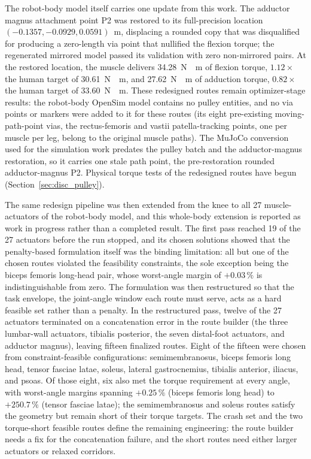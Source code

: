 The robot-body model itself carries one update from this work. The adductor magnus attachment point P2 was restored to its full-precision location $(-0.1357, -0.0929, 0.0591)$~m, displacing a rounded copy that was disqualified for producing a zero-length via point that nullified the flexion torque; the regenerated mirrored model passed its validation with zero non-mirrored pairs. At the restored location, the muscle delivers \qty{34.28}{\newton\cdot\meter} of flexion torque, $1.12\times$ the human target of \qty{30.61}{\newton\cdot\meter}, and \qty{27.62}{\newton\cdot\meter} of adduction torque, $0.82\times$ the human target of \qty{33.60}{\newton\cdot\meter}. These redesigned routes remain optimizer-stage results: the robot-body OpenSim model contains no pulley entities, and no via points or markers were added to it for these routes (its eight pre-existing moving-path-point vias, the rectus-femoris and vastii patella-tracking points, one per muscle per leg, belong to the original muscle paths). The MuJoCo conversion used for the simulation work predates the pulley batch and the adductor-magnus restoration, so it carries one stale path point, the pre-restoration rounded adductor-magnus P2. Physical torque tests of the redesigned routes have begun (Section~\ref{sec:disc_pulley}).

The same redesign pipeline was then extended from the knee to all 27 muscle-actuators of the robot-body model, and this whole-body extension is reported as work in progress rather than a completed result. The first pass reached 19 of the 27 actuators before the run stopped, and its chosen solutions showed that the penalty-based formulation itself was the binding limitation: all but one of the chosen routes violated the feasibility constraints, the sole exception being the biceps femoris long-head pair, whose worst-angle margin of $+0.03\,\%$ is indistinguishable from zero. The formulation was then restructured so that the task envelope, the joint-angle window each route must serve, acts as a hard feasible set rather than a penalty. In the restructured pass, twelve of the 27 actuators terminated on a concatenation error in the route builder (the three lumbar-wall actuators, tibialis posterior, the seven distal-foot actuators, and adductor magnus), leaving fifteen finalized routes. Eight of the fifteen were chosen from constraint-feasible configurations: semimembranosus, biceps femoris long head, tensor fasciae latae, soleus, lateral gastrocnemius, tibialis anterior, iliacus, and psoas. Of those eight, six also met the torque requirement at every angle, with worst-angle margins spanning $+0.25\,\%$ (biceps femoris long head) to $+250.7\,\%$ (tensor fasciae latae); the semimembranosus and soleus routes satisfy the geometry but remain short of their torque targets. The crash set and the two torque-short feasible routes define the remaining engineering: the route builder needs a fix for the concatenation failure, and the short routes need either larger actuators or relaxed corridors.


